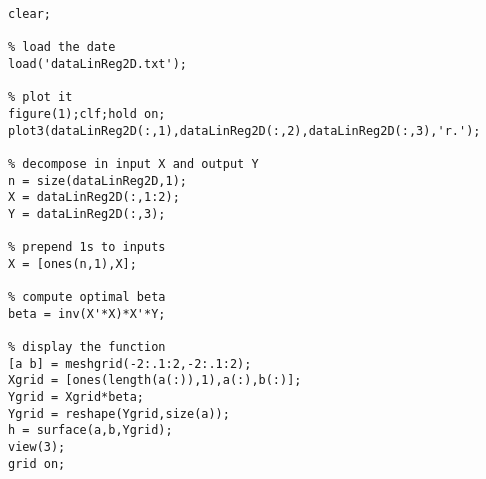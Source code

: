 \begin{code}
\begin{verbatim}
clear;

% load the date
load('dataLinReg2D.txt');

% plot it
figure(1);clf;hold on;
plot3(dataLinReg2D(:,1),dataLinReg2D(:,2),dataLinReg2D(:,3),'r.');

% decompose in input X and output Y
n = size(dataLinReg2D,1);
X = dataLinReg2D(:,1:2);
Y = dataLinReg2D(:,3);

% prepend 1s to inputs
X = [ones(n,1),X];

% compute optimal beta
beta = inv(X'*X)*X'*Y;

% display the function
[a b] = meshgrid(-2:.1:2,-2:.1:2);
Xgrid = [ones(length(a(:)),1),a(:),b(:)];
Ygrid = Xgrid*beta;
Ygrid = reshape(Ygrid,size(a));
h = surface(a,b,Ygrid);
view(3);
grid on;
\end{verbatim}
\end{code}


\exerfoot
